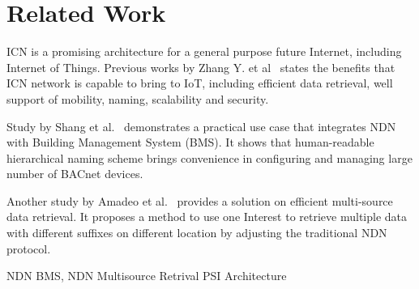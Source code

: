 \section{Related Work}
\label{sec:related}
ICN is a promising architecture for a general purpose future Internet, including Internet of Things. Previous works by Zhang Y. et al~\cite{ietfdraft} states the benefits that ICN network is capable to bring to IoT, including efficient data retrieval, well support of mobility, naming, scalability and security. 

Study by Shang et al.~\cite{shang2014securing} demonstrates a practical use case that integrates NDN with Building Management System (BMS). It shows that human-readable hierarchical naming scheme brings convenience in configuring and managing large number of BACnet devices.

Another study by Amadeo et al.~\cite{amadeo2014multi} provides a solution on efficient multi-source data retrieval. It proposes a method to use one Interest to retrieve multiple data with different suffixes on different location by adjusting the traditional NDN protocol. 

 
NDN BMS, NDN Multisource Retrival
PSI Architecture
